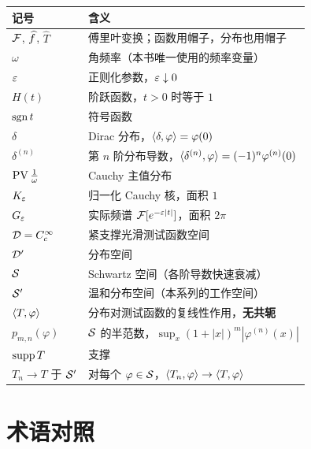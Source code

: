 \begin{center}
\small
\renewcommand{\arraystretch}{1.4}
\begin{tabularx}{\textwidth}{@{}L{3.4cm}Y@{}}
\toprule
记号 & 含义 \\
\midrule
$\mathcal{F}$, $\widehat{f}$, $\widehat{T}$ & 傅里叶变换；函数用帽子，分布也用帽子 \\
$\omega$ & 角频率（本书唯一使用的频率变量） \\
$\varepsilon$ & 正则化参数，$\varepsilon\downarrow0$ \\
$H(t)$ & 阶跃函数，$t>0$ 时等于 $1$ \\
$\operatorname{sgn} t$ & 符号函数 \\
$\delta$ & Dirac 分布，$\langle \delta,\varphi\rangle=\varphi(0)$ \\
$\delta^{(n)}$ & 第 $n$ 阶分布导数，$\langle \delta^{(n)},\varphi\rangle=(-1)^{n}\varphi^{(n)}(0)$ \\
$\operatorname{PV}\frac{1}{\omega}$ & Cauchy 主值分布 \\
$K_\varepsilon$ & 归一化 Cauchy 核，面积 $1$ \\
$G_\varepsilon$ & 实际频谱 $\mathcal{F}[e^{-\varepsilon|t|}]$，面积 $2\pi$ \\
$\mathcal{D}=C_c^{\infty}$ & 紧支撑光滑测试函数空间 \\
$\mathcal{D}'$ & 分布空间 \\
$\mathcal{S}$ & Schwartz 空间（各阶导数快速衰减） \\
$\mathcal{S}'$ & 温和分布空间（本系列的工作空间） \\
$\langle T,\varphi\rangle$ & 分布对测试函数的复线性作用，\textbf{无共轭} \\
$p_{m,n}(\varphi)$ & $\mathcal{S}$ 的半范数，$\sup_x(1+|x|)^{m}|\varphi^{(n)}(x)|$ \\
$\operatorname{supp} T$ & 支撑 \\
$T_n\to T$ 于 $\mathcal{S}'$ & 对每个 $\varphi\in\mathcal{S}$，$\langle T_n,\varphi\rangle\to\langle T,\varphi\rangle$ \\
\bottomrule
\end{tabularx}
\end{center}

\section{术语对照}

